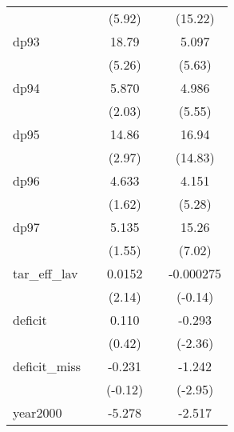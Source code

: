 {\begin{tabular}{l*{4}{c}}
            &                     &      (5.92)         &                     &     (15.22)         \\
[1em]
dp93        &                     &       18.79\sym{***}&                     &       5.097\sym{***}\\
            &                     &      (5.26)         &                     &      (5.63)         \\
[1em]
dp94        &                     &       5.870\sym{*}  &                     &       4.986\sym{***}\\
            &                     &      (2.03)         &                     &      (5.55)         \\
[1em]
dp95        &                     &       14.86\sym{**} &                     &       16.94\sym{***}\\
            &                     &      (2.97)         &                     &     (14.83)         \\
[1em]
dp96        &                     &       4.633         &                     &       4.151\sym{***}\\
            &                     &      (1.62)         &                     &      (5.28)         \\
[1em]
dp97        &                     &       5.135         &                     &       15.26\sym{***}\\
            &                     &      (1.55)         &                     &      (7.02)         \\
[1em]
tar\_eff\_lav &                     &      0.0152\sym{*}  &                     &   -0.000275         \\
            &                     &      (2.14)         &                     &     (-0.14)         \\
[1em]
deficit     &                     &       0.110         &                     &      -0.293\sym{*}  \\
            &                     &      (0.42)         &                     &     (-2.36)         \\
[1em]
deficit\_miss&                     &      -0.231         &                     &      -1.242\sym{**} \\
            &                     &     (-0.12)         &                     &     (-2.95)         \\
[1em]
year2000    &                     &      -5.278\sym{**} &                     &      -2.517\sym{***}\\

\end{tabular}}
